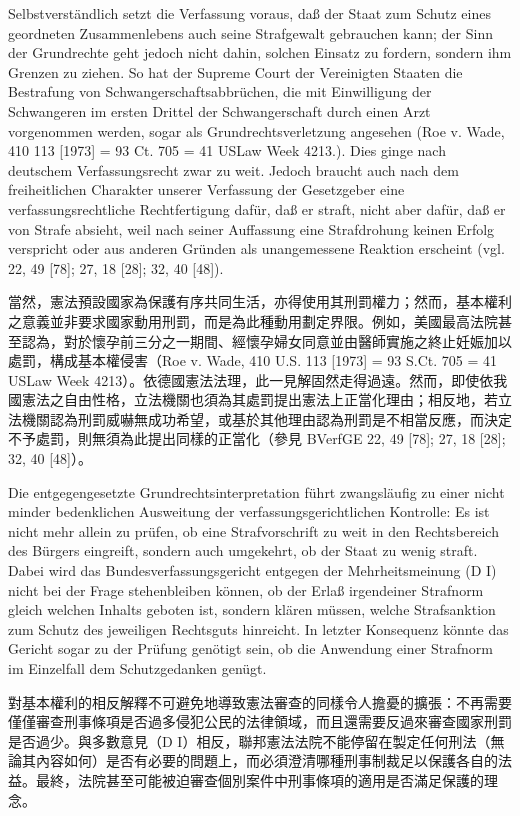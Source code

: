 \documentclass[12pt]{article}
\begin{document}
\syncleft
\begin{sourcepara}
Selbstverständlich setzt die Verfassung voraus, daß der Staat zum Schutz eines geordneten Zusammenlebens auch seine Strafgewalt gebrauchen kann; der Sinn der Grundrechte geht jedoch nicht dahin, solchen Einsatz zu fordern, sondern ihm Grenzen zu ziehen. So hat der Supreme Court der Vereinigten Staaten die Bestrafung von Schwangerschaftsabbrüchen, die mit Einwilligung der Schwangeren im ersten Drittel der Schwangerschaft durch einen Arzt vorgenommen werden, sogar als Grundrechtsverletzung angesehen (Roe v. Wade, 410 \abbrUS{} 113 [1973] = 93 \abbrS{}Ct. 705 = 41 USLaw Week 4213.). Dies ginge nach deutschem Verfassungsrecht zwar zu weit. Jedoch braucht auch nach dem freiheitlichen Charakter unserer Verfassung der Gesetzgeber eine verfassungsrechtliche Rechtfertigung dafür, daß er straft, nicht aber dafür, daß er von Strafe absieht, weil nach seiner Auffassung eine Strafdrohung keinen Erfolg verspricht oder aus anderen Gründen als unangemessene Reaktion erscheint (vgl. \abbrBVerfGE{} 22, 49 [78]; 27, 18 [28]; 32, 40 [48]).
\end{sourcepara}
\begin{transpara}
當然，憲法預設國家為保護有序共同生活，亦得使用其刑罰權力；然而，基本權利之意義並非要求國家動用刑罰，而是為此種動用劃定界限。例如，美國最高法院甚至認為，對於懷孕前三分之一期間、經懷孕婦女同意並由醫師實施之終止妊娠加以處罰，構成基本權侵害（Roe v. Wade, 410 U.S. 113 [1973] = 93 S.Ct. 705 = 41 USLaw Week 4213）。依德國憲法法理，此一見解固然走得過遠。然而，即使依我國憲法之自由性格，立法機關也須為其處罰提出憲法上正當化理由；相反地，若立法機關認為刑罰威嚇無成功希望，或基於其他理由認為刑罰是不相當反應，而決定不予處罰，則無須為此提出同樣的正當化（參見 BVerfGE 22, 49 [78]; 27, 18 [28]; 32, 40 [48]）。
\end{transpara}

\syncleft
\begin{sourcepara}
Die entgegengesetzte Grundrechtsinterpretation führt zwangsläufig zu einer nicht minder bedenklichen Ausweitung der verfassungsgerichtlichen Kontrolle: Es ist nicht mehr allein zu prüfen, ob eine Strafvorschrift zu weit in den Rechtsbereich des Bürgers eingreift, sondern auch umgekehrt, ob der Staat zu wenig straft. Dabei wird das Bundesverfassungsgericht entgegen der Mehrheitsmeinung (D I) nicht bei der Frage stehenbleiben können, ob der Erlaß irgendeiner Strafnorm gleich welchen Inhalts geboten ist, sondern klären müssen, welche Strafsanktion zum Schutz des jeweiligen Rechtsguts hinreicht. In letzter Konsequenz könnte das Gericht sogar zu der Prüfung genötigt sein, ob die Anwendung einer Strafnorm im Einzelfall dem Schutzgedanken genügt.
\end{sourcepara}
\begin{transpara}
對基本權利的相反解釋不可避免地導致憲法審查的同樣令人擔憂的擴張：不再需要僅僅審查刑事條項是否過多侵犯公民的法律領域，而且還需要反過來審查國家刑罰是否過少。與多數意見（D I）相反，聯邦憲法法院不能停留在製定任何刑法（無論其內容如何）是否有必要的問題上，而必須澄清哪種刑事制裁足以保護各自的法益。最終，法院甚至可能被迫審查個別案件中刑事條項的適用是否滿足保護的理念。
\end{transpara}
\end{document}
